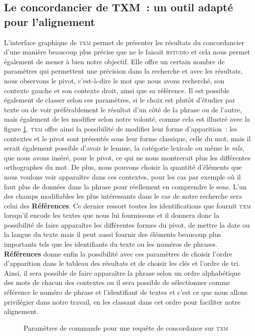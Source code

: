 \subsection{Le concordancier de TXM~: un outil adapté pour l’alignement}
L’interface graphique de \textsc{txm} permet de présenter les résultats du concordancier d’une manière beaucoup plus précise que ne le faisait \textsc{rstudio} et cela nous permet également de mener à bien notre objectif. Elle offre un certain nombre de paramètres qui permettent une précision dans la recherche et avec les résultats, nous observons le pivot, c’est-à-dire le mot que nous avons recherché, son contexte gauche et son contexte droit, ainsi que sa référence. Il est possible également de classer selon ces paramètres, si le choix est plutôt d’étudier par texte ou de voir préférablement le résultat d’un côté de la phrase ou de l’autre, mais également de les modifier selon notre volonté, comme cela est illustré avec la figure \ref{fig:concordancier_parametres}. \textsc{txm} offre ainsi la possibilité de modifier leur forme d’apparition~: les contextes et le pivot sont présentés sous leur forme classique, celle du mot, mais il serait également possible d’avoir le lemme, la catégorie lexicale ou même le \emph{mlx}, que nous avons inséré, pour le pivot, ce qui ne nous montrerait plus les différentes orthographes du mot. De plus, nous pouvons choisir la quantité d’éléments que nous voulons voir apparaître dans ces contextes, pour les cas par exemple où il faut plus de données dans la phrase pour réellement en comprendre le sens. L’un des champs modifiables les plus intéressants dans le cas de notre recherche sera celui des \textbf{Références}. Ce dernier ressort toutes les identifications que fournit \textsc{txm} lorsqu’il encode les textes que nous lui fournissons et il donnera donc la possibilité de faire apparaître les différentes formes du pivot, de mettre la date ou la langue du texte mais il peut aussi fournir des éléments beaucoup plus importants tels que les identifiants du texte ou les numéros de phrases. \textbf{Références} donne enfin la possibilité avec ces paramètres de choisir l’ordre d’apparition dans le tableau des résultats et de choisir les clés et l’ordre de tri. Ainsi, il sera possible de faire apparaître la phrase selon un ordre alphabétique des mots de chacun des contextes ou il sera possible de sélectionner comme référence le numéro de phrase et l’identifiant de textes et c’est ce que nous allons privilégier dans notre travail, en les classant dans cet ordre pour faciliter notre alignement.
\begin{figure}[H]
    \centering
    \caption{Paramètres de commande pour une requête de concordance sur \textsc{txm}}
    \label{fig:concordancier_parametres}
\end{figure}


